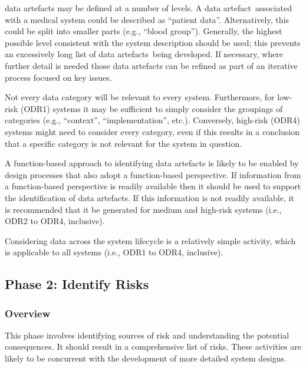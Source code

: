 \Glspl{data artefact} may be defined at a number of levels. \cbstart A \gls{data artefact}\cbend\ associated with a medical system could be described as ``patient data''. Alternatively, this could be split into smaller parts (e.g., ``blood group''). \cbstart Generally\cbend, the highest possible level consistent with the system description should be used; this prevents an excessively long list of \cbstart\glspl{data artefact}\cbend\ being developed. If necessary, \cbstart where further detail is needed those \glspl{data artefact} can be refined as part of an iterative process focused on key issues\cbend.

Not every data category will be relevant to every system. Furthermore, for low-risk (ODR1) systems it may be sufficient to simply consider the groupings of categories (e.g., ``context'', ``implementation'', etc.). Conversely, high-risk (ODR4) systems might need to consider every category, even if this results in a conclusion that a specific category is not relevant for the system in question.

A function-based approach to identifying \glspl{data artefact} is likely to be enabled by design processes that also adopt a function-based perspective. If \gls{information} from a function-based perspective is readily available then it should be used to support the identification of \glspl{data artefact}. If this \gls{information} is not readily available, it is recommended that it be generated for medium and high-risk systems (i.e., ODR2 to ODR4, inclusive).

Considering data across the system lifecycle is a relatively simple activity, which is applicable to all systems (i.e., ODR1 to ODR4, inclusive).

\subsection{Phase 2: Identify Risks}
\subsubsection{Overview}
This phase involves identifying sources of risk and understanding the potential consequences. It should result in a comprehensive list of risks. \cbstart These activities are likely to be concurrent with the development of more detailed system designs\cbend.

